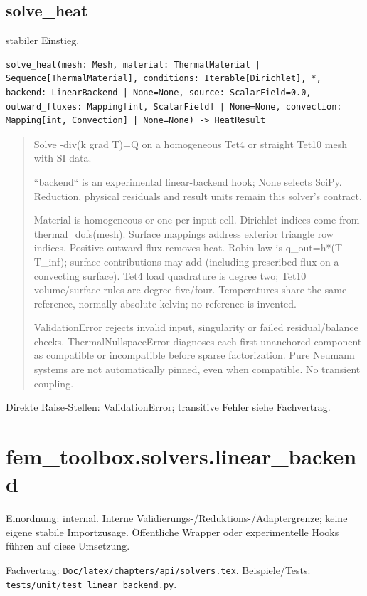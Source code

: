 \subsection{solve\_heat}
stabiler Einstieg.
\begin{lstlisting}
solve_heat(mesh: Mesh, material: ThermalMaterial | Sequence[ThermalMaterial], conditions: Iterable[Dirichlet], *, backend: LinearBackend | None=None, source: ScalarField=0.0, outward_fluxes: Mapping[int, ScalarField] | None=None, convection: Mapping[int, Convection] | None=None) -> HeatResult
\end{lstlisting}
\begin{quote}
Solve -div(k grad T)=Q on a homogeneous Tet4 or straight Tet10 mesh with SI data.\par ``backend`` is an experimental linear-backend hook; None selects SciPy. Reduction, physical residuals and result units remain this solver's contract.\par Material is homogeneous or one per input cell. Dirichlet indices come from thermal\_dofs(mesh). Surface mappings address exterior triangle row indices. Positive outward flux removes heat. Robin law is q\_out=h*(T-T\_inf); surface contributions may add (including prescribed flux on a convecting surface). Tet4 load quadrature is degree two; Tet10 volume/surface rules are degree five/four. Temperatures share the same reference, normally absolute kelvin; no reference is invented.\par ValidationError rejects invalid input, singularity or failed residual/balance checks. ThermalNullspaceError diagnoses each first unanchored component as compatible or incompatible before sparse factorization. Pure Neumann systems are not automatically pinned, even when compatible. No transient coupling.
\end{quote}
Direkte Raise-Stellen: ValidationError; transitive Fehler siehe Fachvertrag.
\section{fem\_toolbox.solvers.linear\_backend}
Einordnung: internal. Interne Validierungs-/Reduktions-/Adaptergrenze; keine eigene stabile Importzusage. Öffentliche Wrapper oder experimentelle Hooks führen auf diese Umsetzung.
\par Fachvertrag: \nolinkurl{Doc/latex/chapters/api/solvers.tex}. Beispiele/Tests:
\nolinkurl{tests/unit/test_linear_backend.py}.
